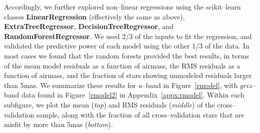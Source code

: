 \documentclass[DM,toc]{lsstdoc}
\begin{document}
Accordingly, we further explored non--linear regressions using the
scikit--learn classes {\bf LinearRegression} (effectively the same as
above), {\bf ExtraTreeRegressor}, {\bf DecisionTreeRegressor}, and
{\bf RandomForestRegressor}.  We used 2/3 of the inputs to fit the
regression, and validated the predictive power of each model using the
other 1/3 of the data.  In most cases we found that the random forests
provided the best results, in terms of the mean model residuals as a
function of airmass, the RMS residuals as a function of airmass, and
the fraction of stars showing unmodeled residuals larger than 5mas.
We summarize these results for $u$--band in Figure~\ref{rmodel}, with
$griz$--band data found in Figure~\ref{rmodel2} in
Appendix~\ref{appx:rmodel}.  Within each subfigure, we plot the mean
({\it top}) and RMS residuals ({\it middle}) of the cross--validation
sample, along with the fraction of all cross--validation stars that
are misfit by more than 5mas ({\it bottom}).
\end{document}
